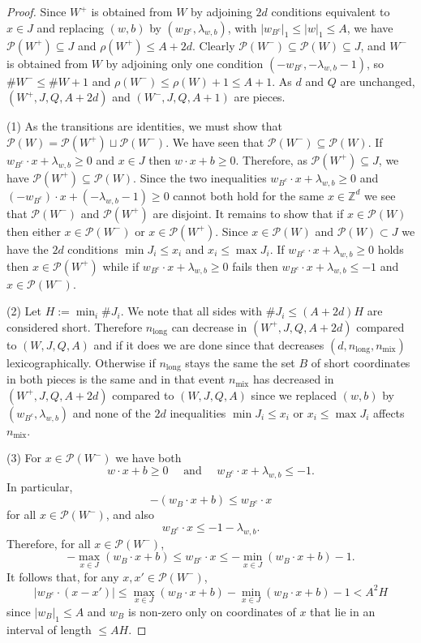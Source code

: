 \documentclass[a4paper,reqno,12pt]{amsart}
\theoremstyle{plain}
\theoremstyle{plain}
\theoremstyle{remark}
\theoremstyle{plain}
\newcommand{\cP}{\mathscr{P}}
\theoremstyle{plain}
\theoremstyle{plain}
\begin{document}
{\begin{proof}
Since $W^{+}$ is obtained from $W$ by adjoining $2d$ conditions equivalent to $x \in J$ and replacing
$(w,b)$ by $(w_{B^c}, \lambda_{w,b})$, with $|w_{B^c}|_1 \leq |w|_1 \leq A$, we have
$\cP(W^+) \subseteq J$ and $\rho(W^{+}) \leq A + 2d$. Clearly $\cP(W^{-}) \subseteq \cP(W) \subseteq J$,
and $W^{-}$ is obtained from $W$ by adjoining only one condition $(-w_{B^c}, - \lambda_{w,b} - 1)$,
so $\# W^{-} \leq \# W + 1$ and $\rho(W^{-}) \leq \rho(W) + 1 \leq A + 1$. As $d$ and $Q$ are
unchanged, $(W^{+}, J, Q, A + 2d)$ and $(W^{-}, J, Q, A + 1)$ are pieces.

(1) As the transitions are identities, we must show that $\cP(W)=\cP(W^+)\sqcup\cP(W^-)$. We have
seen that $\cP(W^{-}) \subseteq \cP(W)$. If $w_{B^c} \cdot x + \lambda_{w,b} \geq 0$
and $x \in J$ then $w \cdot x + b \geq 0$. Therefore, as $\cP(W^+) \subseteq J$, we have
$\cP(W^+) \subseteq \cP(W)$.
Since the two inequalities $w_{B^c} \cdot x + \lambda_{w,b} \geq 0$ and $(-w_{B^c}) \cdot x + (-\lambda_{w,b} - 1) \geq 0$
cannot both hold for the same $x \in \mathbb{Z}^d$ we see that $\cP(W^{-})$ and $\cP(W^{+})$ are disjoint. It remains to 
show that if $x \in \cP(W)$ then either $x \in \cP(W^{-})$ or $x \in \cP(W^{+})$. 
Since $x \in \cP(W)$ and $\cP(W) \subset J$ we have the $2d$ conditions $\min J_i \leq x_i$ and $x_i \leq \max J_i$. 
If $w_{B^c} \cdot x + \lambda_{w,b} \geq 0$ holds then $x \in \cP(W^+)$ while if $w_{B^c} \cdot x + \lambda_{w,b} \geq 0$ fails
then $w_{B^c} \cdot x + \lambda_{w,b} \leq -1$ and $x \in \cP(W^{-})$. 

(2) Let $H := \min_i \# J_i$. We note that all sides with $\#J_i \leq (A + 2d)H$ are considered short. Therefore $n_{\text{long}}$ can decrease in $(W^+, J, Q, A + 2d)$ compared to $(W, J, Q, A)$ and if it does we are done since that decreases $(d, n_{\text{long}}, n_{\text{mix}})$ lexicographically. Otherwise if $n_{\text{long}}$ stays the same the set $B$ of short coordinates in both pieces is the same and in that event $n_{\text{mix}}$ has decreased in $(W^+, J, Q, A + 2d)$ compared to $(W, J, Q, A)$ since we replaced $(w,b)$ by $(w_{B^c}, \lambda_{w,b})$ and none of the $2d$ inequalities $\min J_i \leq x_i$ or $x_i \leq \max J_i$ affects $n_{\text{mix}}$. 

(3) For $x \in \cP(W^{-})$ we have both 
$$
w \cdot x + b \geq 0 \quad \text{ and } \quad w_{B^c} \cdot x + \lambda_{w,b} \leq - 1{.} 
$$
In particular, 
$$
- (w_{B} \cdot x + b) \leq w_{B^c} \cdot x  
$$
for all $x \in \cP(W^{-})$, and also 
$$
w_{B^c} \cdot x \leq - 1 - \lambda_{w,b}.
$$
Therefore, for all $x \in \cP(W^{-})$,
$$
- \max_{x \in J} (w_B \cdot x + b) \leq w_{B^c} \cdot x \leq - \min_{x \in J} (w_B \cdot x + b) - 1{.}
$$
It follows that, for any $x, x' \in \cP(W^{-})$, 
$$
|w_{B^c} \cdot (x - x')| \leq \max_{x \in J} (w_B \cdot x + b) - \min_{x \in J} (w_B \cdot x + b) - 1 < A^2 H 
$$
since $|w_B|_1 \leq A$ and $w_{B}$ is non-zero only on coordinates of $x$ that lie in an interval of length $\leq A H$.
\end{proof}

}
\end{document}
